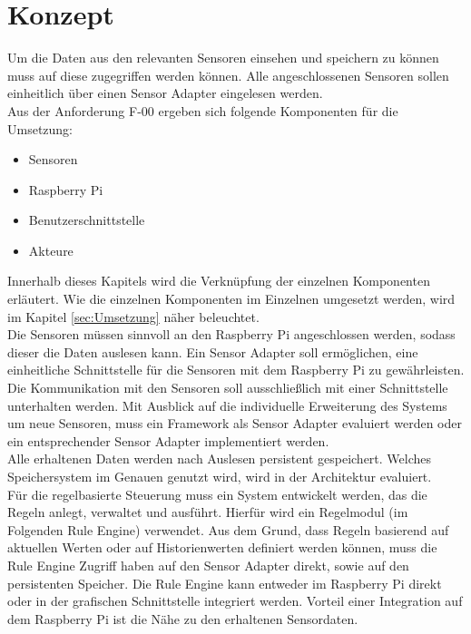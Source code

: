 \section{Konzept}
Um die Daten aus den relevanten Sensoren einsehen und speichern zu können muss auf diese zugegriffen werden können. Alle angeschlossenen Sensoren sollen einheitlich über einen Sensor Adapter eingelesen werden.\\
Aus der Anforderung F-00 ergeben sich folgende Komponenten für die Umsetzung:
\begin{itemize}
	\item Sensoren
	\item Raspberry Pi
	\item Benutzerschnittstelle
	\item Akteure
\end{itemize}
Innerhalb dieses Kapitels wird die Verknüpfung der einzelnen Komponenten erläutert. Wie die einzelnen Komponenten im Einzelnen umgesetzt werden, wird im Kapitel \ref{sec:Umsetzung} näher beleuchtet.\\
Die Sensoren müssen sinnvoll an den Raspberry Pi angeschlossen werden, sodass dieser die Daten auslesen kann. Ein Sensor Adapter soll ermöglichen, eine einheitliche Schnittstelle für die Sensoren mit dem Raspberry Pi zu gewährleisten. Die Kommunikation mit den Sensoren soll ausschließlich mit einer Schnittstelle unterhalten werden. Mit Ausblick auf die individuelle Erweiterung des Systems um neue Sensoren, muss ein Framework als Sensor Adapter evaluiert werden oder ein entsprechender Sensor Adapter implementiert werden.\\
Alle erhaltenen Daten werden nach Auslesen persistent gespeichert. Welches Speichersystem im Genauen genutzt wird, wird in der Architektur evaluiert.\\
Für die regelbasierte Steuerung muss ein System entwickelt werden, das die Regeln anlegt, verwaltet und ausführt. Hierfür wird ein Regelmodul (im Folgenden Rule Engine) verwendet. Aus dem Grund, dass Regeln basierend auf aktuellen Werten oder auf Historienwerten definiert werden können, muss die Rule Engine Zugriff haben auf den Sensor Adapter direkt, sowie auf den persistenten Speicher. Die Rule Engine kann entweder im Raspberry Pi direkt oder in der grafischen Schnittstelle integriert werden. Vorteil einer Integration auf dem Raspberry Pi ist die Nähe zu den erhaltenen Sensordaten.\\
